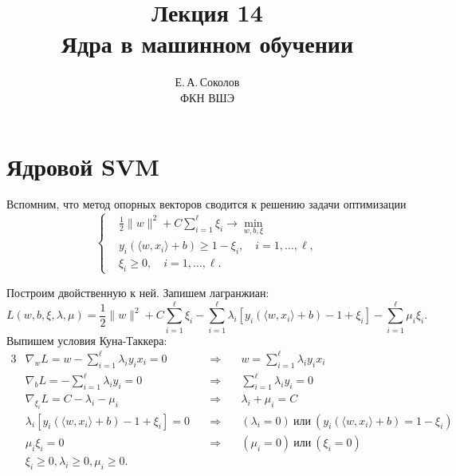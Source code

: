 \documentclass[12pt,fleqn]{article}
\begin{document}
\title{Лекция 14\\Ядра в машинном обучении}
\author{Е.\,А.\,Соколов\\ФКН ВШЭ}
\maketitle

\section{Ядровой SVM}

Вспомним, что метод опорных векторов сводится к решению задачи оптимизации
\begin{equation}
\label{eq:svmUnsep}
    \left\{
        \begin{aligned}
            & \frac{1}{2} \|w\|^2 + C \sum_{i = 1}^{\ell} \xi_i \to \min_{w, b, \xi} \\
            & y_i \left(
                \langle w, x_i \rangle + b
            \right) \geq 1 - \xi_i, \quad i = 1, \dots, \ell, \\
            & \xi_i \geq 0, \quad i = 1, \dots, \ell.
        \end{aligned}
    \right.
\end{equation}

Построим двойственную к ней.
Запишем лагранжиан:
\[
    L(w, b, \xi, \lambda, \mu)
    =
    \frac{1}{2} \|w\|^2 + C \sum_{i = 1}^{\ell} \xi_i
    -
    \sum_{i = 1}^{\ell} \lambda_i \left[
        y_i \left(
                \langle w, x_i \rangle + b
            \right) - 1 + \xi_i
    \right]
    -
    \sum_{i = 1}^{\ell}
        \mu_i \xi_i.
\]
Выпишем условия Куна-Таккера:
\begin{alignat}{3}
    \label{eq:svmKktW}
    & \nabla_w L = w - \sum_{i = 1}^{\ell} \lambda_i y_i x_i = 0
    & \quad\Longrightarrow\quad
    & w = \sum_{i = 1}^{\ell} \lambda_i y_i x_i \\
    \label{eq:svmKktB}
    & \nabla_b L = - \sum_{i = 1}^{\ell} \lambda_i y_i = 0
    & \quad\Longrightarrow\quad
    & \sum_{i = 1}^{\ell} \lambda_i y_i = 0 \\
    \label{eq:svmKktXi}
    & \nabla_{\xi_i} L = C - \lambda_i - \mu_i
    & \quad\Longrightarrow\quad
    & \lambda_i + \mu_i = C \\
    \label{eq:svmKktSlack1}
    & \lambda_i \left[
        y_i \left(
                \langle w, x_i \rangle + b
            \right) - 1 + \xi_i
        \right] = 0
    & \quad\Longrightarrow\quad
    & (\lambda_i = 0)
        \ \text{или}\
        \left(
            y_i \left(
                \langle w, x_i \rangle + b
            \right)
            =
            1 - \xi_i
        \right) \\
    \label{eq:svmKktSlack2}
    & \mu_i \xi_i = 0
    & \quad\Longrightarrow\quad
    & (\mu_i = 0)
        \ \text{или}\
        (\xi_i = 0) \\
    &\xi_i \geq 0, \lambda_i \geq 0, \mu_i \geq 0.
\end{alignat}
\end{document}
